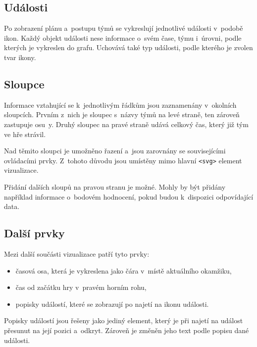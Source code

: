 \documentclass[
  digital, %
  oneside, %
  table,   %
  nolof,     %
  nolot,     %
]{fithesis3}
\begin{document}
\subsection{Události}
Po zobrazení plánu a~postupu týmů se vykreslují jednotlivé události v~podobě ikon. Každý objekt události nese informace o~svém čase, týmu i~úrovni, podle kterých je vykreslen do grafu. Uchovává také typ události, podle kterého je zvolen tvar ikony.
\subsection{Sloupce}
Informace vztahující se k~jednotlivým řádkům jsou zaznamenány v~okolních sloupcích. Prvním z~nich je sloupec s~názvy týmů na levé straně, ten zároveň zastupuje osu~y. Druhý sloupec na pravé straně udává celkový čas, který již tým ve hře strávil.\par
Nad těmito sloupci je umožněno řazení a~jsou zarovnány se souvisejícími ovládacími prvky. Z~tohoto důvodu jsou umístěny mimo hlavní \verb|<svg>| element vizualizace.\par
Přidání dalších sloupů na pravou stranu je možné. Mohly by být přidány například informace o~bodovém hodnocení, pokud budou k~dispozici odpovídající data.
\subsection{Další prvky}
Mezi další součásti vizualizace patří tyto prvky:
\begin{itemize}
  \item časová osa, která je vykreslena jako čára v~místě aktuálního okamžiku,
  \item čas od začátku hry v~pravém horním rohu,
  \item popisky událostí, které se zobrazují po najetí na ikonu události.
\end{itemize}
Popisky událostí jsou řešeny jako jediný element, který je při najetí na událost přesunut na její pozici a~odkryt. Zároveň je změněn jeho text podle popisu dané události.
\end{document}
